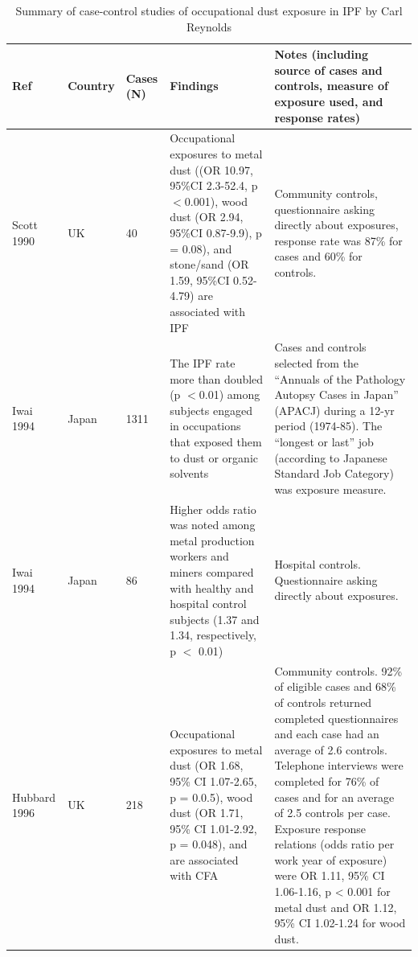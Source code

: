 \documentclass[a4paper,10pt]{article}
\begin{document}
\begin{appendices}
\newpage

\begin{table}[htbp]\centering
\caption*{Summary of case-control studies of occupational dust exposure in IPF by Carl Reynolds}


\label{OccupationalDustTable1}
\tiny	
\begin{tabular}{p{1.3cm}p{0.8cm}p{0.8cm}p{6cm}p{5cm}}
\toprule
\textbf{Ref} & \textbf{Country} & \textbf{Cases (N)} & \textbf{Findings} & \textbf{Notes (including source of cases and controls, measure of exposure used, and response rates)}\\
\midrule

Scott 1990 & UK & 40 & Occupational exposures to metal dust ((OR 10.97, 95\%CI 2.3-52.4, p\ensuremath{<}0.001), wood dust (OR 2.94, 95\%CI 0.87-9.9), p = 0.08), and stone/sand (OR 1.59, 95\%CI 0.52-4.79) are associated with IPF & Community controls, questionnaire asking directly about exposures, response rate was 87\% for cases and 60\% for controls.\\


Iwai 1994 & Japan & 1311 & The IPF rate more than doubled (p \ensuremath{<}0.01) among subjects engaged in occupations that exposed them to dust or organic solvents & Cases and controls selected from the ``Annuals of the Pathology Autopsy Cases in Japan'' (APACJ) during a 12-yr period (1974-85). The ``longest or last'' job (according to Japanese Standard Job Category) was exposure measure. \\


Iwai 1994 & Japan & 86 & Higher odds ratio was noted among metal production workers and miners compared with healthy and hospital control subjects (1.37 and 1.34, respectively, p \ensuremath{<} 0.01) & Hospital controls. Questionnaire asking directly about exposures. \\


Hubbard 1996 & UK & 218 & Occupational exposures to metal dust (OR 1.68, 95\% CI 1.07-2.65, p = 0.0.5), wood dust (OR 1.71, 95\% CI 1.01-2.92, p = 0.048), and are associated with CFA & Community controls. 92\% of eligible cases and 68\% of controls returned completed questionnaires and each case had an average of 2.6 controls. Telephone interviews were completed for 76\% of cases and for an average of 2.5 controls per case. Exposure response relations (odds ratio per work year of exposure) were OR 1.11, 95\% CI 1.06-1.16, p < 0.001 for metal dust and OR 1.12, 95\% CI 1.02-1.24 for wood dust. \\


\end{tabular}
\end{table}
\end{appendices}
\end{document}
